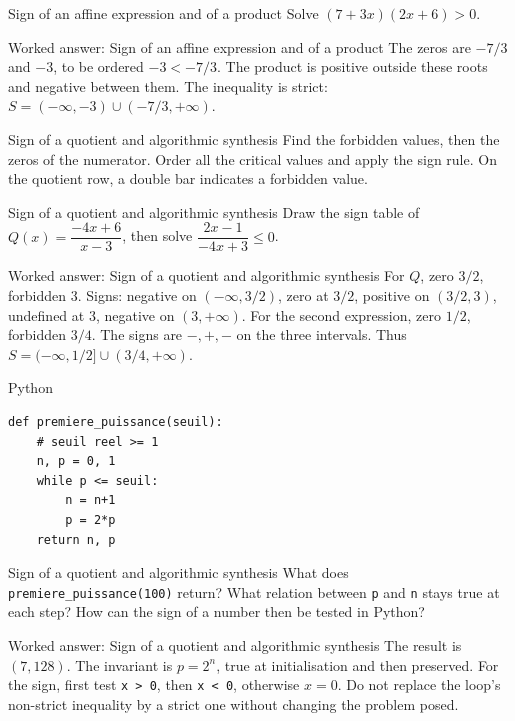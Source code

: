 \documentclass[aspectratio=169,10pt]{beamer}
\begin{document}
\begin{frame}{Sign of an affine expression and of a product}
Solve \((7+3x)(2x+6)>0\).
\end{frame}
\begin{frame}{Worked answer: Sign of an affine expression and of a product}
The zeros are \(-7/3\) and \(-3\), to be ordered \(-3<-7/3\). The product is positive outside these roots and negative between them. The inequality is strict: \(S=(-\infty,-3)\cup(-7/3,+\infty)\).
\end{frame}
\begin{frame}{Sign of a quotient and algorithmic synthesis}
Find the forbidden values, then the zeros of the numerator. Order all the critical values and apply the sign rule. On the quotient row, a double bar indicates a forbidden value.
\end{frame}
\begin{frame}{Sign of a quotient and algorithmic synthesis}
Draw the sign table of \(Q(x)=\dfrac{-4x+6}{x-3}\), then solve \(\dfrac{2x-1}{-4x+3}\leq0\).
\end{frame}
\begin{frame}{Worked answer: Sign of a quotient and algorithmic synthesis}
For \(Q\), zero \(3/2\), forbidden \(3\). Signs: negative on \((-\infty,3/2)\), zero at \(3/2\), positive on \((3/2,3)\), undefined at \(3\), negative on \((3,+\infty)\).
For the second expression, zero \(1/2\), forbidden \(3/4\). The signs are \(-,+,-\) on the three intervals. Thus \(S=(-\infty,1/2]\cup(3/4,+\infty)\).
\end{frame}
\begin{frame}[fragile]{Python}
\small
\begin{verbatim}
def premiere_puissance(seuil):
    # seuil reel >= 1
    n, p = 0, 1
    while p <= seuil:
        n = n+1
        p = 2*p
    return n, p
\end{verbatim}
\end{frame}
\begin{frame}{Sign of a quotient and algorithmic synthesis}
What does \texttt{premiere\_puissance(100)} return? What relation between \texttt{p} and \texttt{n} stays true at each step? How can the sign of a number then be tested in Python?
\end{frame}
\begin{frame}{Worked answer: Sign of a quotient and algorithmic synthesis}
The result is \((7,128)\). The invariant is \(p=2^n\), true at initialisation and then preserved. For the sign, first test \texttt{x > 0}, then \texttt{x < 0}, otherwise \(x=0\). Do not replace the loop's non-strict inequality by a strict one without changing the problem posed.
\end{frame}
\end{document}
